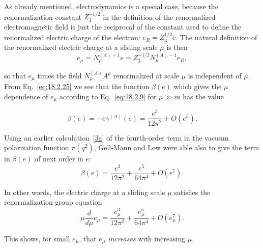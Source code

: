 As already mentioned, electrodynamics is a special case, because the
renormalization constant $Z_3^{-1/2}$ in the definition of the renormalized
electromagnetic field is just the reciprocal of the constant used to define
the renormalized electric charge of the electron: $e_R=Z_3^{1/2}e$. The
natural definition of the renormalized electric charge at a sliding scale
$\mu$ is then
\begin{equation}
e_\mu=N_\mu^{(A)-1}e=Z_3^{-1/2}N_\mu^{(A)-1}e_R,
\tag{18.2.36}\label{eq:18.2.36}
\end{equation}
\par\noindent
\begin{sloppypar}
so that $e_\mu$ times the field $N_\mu^{(A)}A^\rho$ renormalized at scale
$\mu$ is independent of $\mu$. From Eq.~\eqref{eq:18.2.25} we see that the
function $\beta(e)$ which gives the $\mu$ dependence of $e_\mu$ according to
Eq.~\eqref{eq:18.2.9} for $\mu\gg m$ has the value
\end{sloppypar}
\begin{equation}
\beta(e)=-e\gamma^{(A)}(e)=\frac{e^3}{12\pi^2}+O(e^5).
\tag{18.2.37}\label{eq:18.2.37}
\end{equation}
\par\noindent
Using an earlier calculation~\hyperref[ch18-ref-3a]{[3a]} of the fourth-order
term in the vacuum polarization function $\pi(q^2)$, Gell-Mann and Low were
able also to give the term in $\beta(e)$ of next order in $e$:
\begin{equation}
\beta(e)=\frac{e^3}{12\pi^2}+\frac{e^5}{64\pi^4}+O(e^7).
\tag{18.2.38}\label{eq:18.2.38}
\end{equation}
\par\noindent
In other words, the electric charge at a sliding scale $\mu$ satisfies the
renormalization group equation
\begin{equation}
\mu\frac{d}{d\mu}e_\mu
=\frac{e_\mu^3}{12\pi^2}+\frac{e_\mu^5}{64\pi^4}+O(e_\mu^7).
\tag{18.2.39}\label{eq:18.2.39}
\end{equation}
\par\noindent
This shows, for small $e_\mu$, that $e_\mu$ \emph{increases} with increasing
$\mu$.

